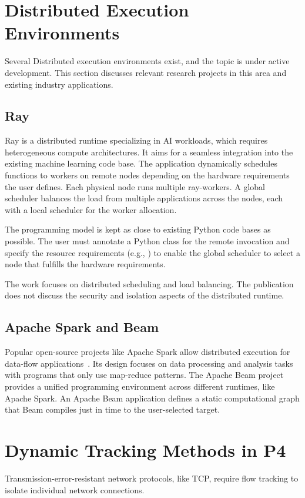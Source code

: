 \section{Distributed Execution Environments}
Several Distributed execution environments exist, and the topic is under active development. This section discusses relevant research projects in this area and existing industry applications.

\subsection{Ray}
Ray is a distributed runtime specializing in \ac{AI} workloads, which requires heterogeneous compute architectures. It aims for a seamless integration into the existing machine learning code base. The application dynamically schedules functions to workers on remote nodes depending on the hardware requirements the user defines. Each physical node runs multiple ray-workers. A global scheduler balances the load from multiple applications across the nodes, each with a local scheduler for the worker allocation.

The programming model is kept as close to existing Python code bases as possible. The user must annotate a Python class for the remote invocation and specify the resource requirements (e.g., ) to enable the global scheduler to select a node that fulfills the hardware requirements.

The work focuses on distributed scheduling and load balancing. The publication does not discuss the security and isolation aspects of the distributed runtime.

\subsection{Apache Spark and Beam}
Popular open-source projects like Apache Spark allow distributed execution for data-flow applications~\cite{ApacheSparkUnified}. Its design focuses on data processing and analysis tasks with programs that only use map-reduce patterns. The Apache Beam project~\cite{theapachesoftwarefoundationApacheBeam} provides a unified programming environment across different runtimes, like Apache Spark. An Apache Beam application defines a static computational graph that Beam compiles just in time to the user-selected target.

\section{Dynamic Tracking Methods in P4}%
\label{sec:tracking-rmt}
Transmission-error-resistant network protocols, like \ac{TCP}, require flow tracking to isolate individual network connections.

